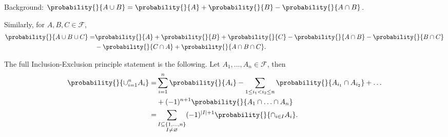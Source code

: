 \begin{property}
\begin{enumerate}
        Background: \(\probability{}{A\cup B} = \probability{}{A} +\probability{}{B} -\probability{}{A\cap B} \).

        Similarly, for \(A,B,C \in \mathcal{F} \),
        \begin{align*}
            \probability{}{A\cup B \cup C} = &\probability{}{A} +\probability{}{B} +\probability{}{C} -\probability{}{A\cap B} -\probability{}{B\cap C}\\
            &- \probability{}{C\cap A} + \probability{}{A\cap B\cap C}.
        \end{align*}

        The full Inclusion-Exclusion principle statement is the following. Let \(A_1, \ldots ,A_n \in \mathcal{F}  \), then
        \begin{align*}
            \probability{}{\cup_{i=1}^{n}A_i} = &\sum\limits_{i=1}^{n} \probability{}{A_i} - \sum\limits_{1\leq i_1<i_2\leq n} \probability{}{A_{i_1}\cap A_{i_2}} + \ldots\\
            & + (-1)^{n+1} \probability{}{A_1\cap \ldots \cap A_n }\\
            =& \sum\limits_{\substack{I \subseteq \{1, \ldots ,n \}\\ I \neq \varnothing}} (-1)^{\left\vert I \right\vert +1} \probability{}{\cap_{i\in I}A_i} .
        \end{align*}
    \end{enumerate}
\end{property}
